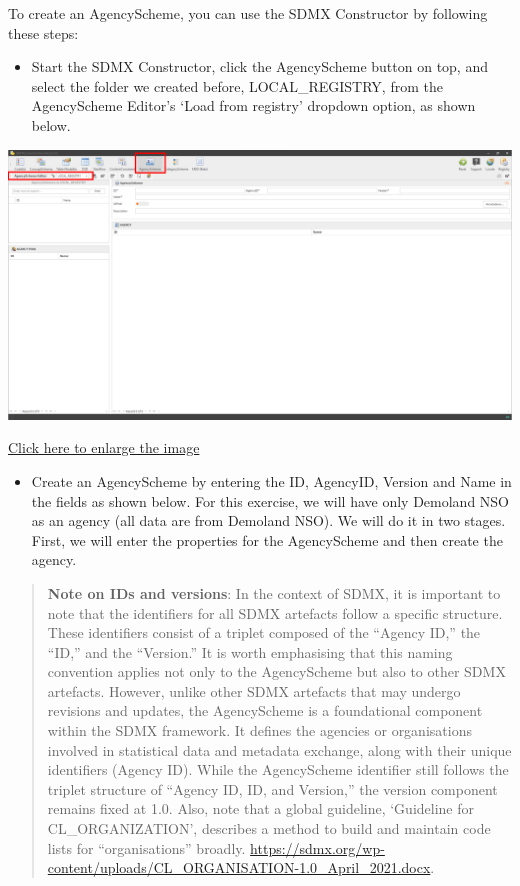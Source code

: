 \documentclass[
]{book}
\providecommand{\tightlist}{%
  \setlength{\itemsep}{0pt}\setlength{\parskip}{0pt}}
\begin{document}
To create an AgencyScheme, you can use the SDMX Constructor by following these steps:

\begin{itemize}
\tightlist
\item
  Start the SDMX Constructor, click the AgencyScheme button on top, and select the folder we created before, LOCAL\_REGISTRY, from the AgencyScheme Editor's `Load from registry' dropdown option, as shown below.
\end{itemize}

\begin{center}\includegraphics[width=1\linewidth]{./images/image060} \end{center}

\href{images/image060.png}{Click here to enlarge the image}

\begin{itemize}
\tightlist
\item
  Create an AgencyScheme by entering the ID, AgencyID, Version and Name in the fields as shown below. For this exercise, we will have only Demoland NSO as an agency (all data are from Demoland NSO). We will do it in two stages. First, we will enter the properties for the AgencyScheme and then create the agency.
\end{itemize}

\begin{quote}
\textbf{Note on IDs and versions}: In the context of SDMX, it is important to note that the identifiers for all SDMX artefacts follow a specific structure. These identifiers consist of a triplet composed of the ``Agency ID,'' the ``ID,'' and the ``Version.'' It is worth emphasising that this naming convention applies not only to the AgencyScheme but also to other SDMX artefacts. However, unlike other SDMX artefacts that may undergo revisions and updates, the AgencyScheme is a foundational component within the SDMX framework. It defines the agencies or organisations involved in statistical data and metadata exchange, along with their unique identifiers (Agency ID). While the AgencyScheme identifier still follows the triplet structure of ``Agency ID, ID, and Version,'' the version component remains fixed at 1.0. Also, note that a global guideline, `Guideline for CL\_ORGANIZATION', describes a method to build and maintain code lists for ``organisations'' broadly. \url{https://sdmx.org/wp-content/uploads/CL_ORGANISATION-1.0_April_2021.docx}.
\end{quote}
\end{document}
